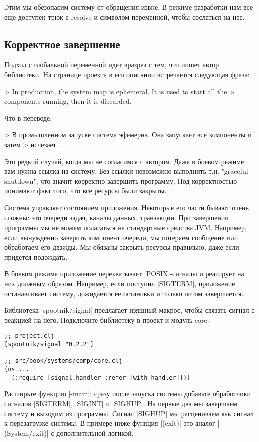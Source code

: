 Этим мы обезопасим систему от обращения извне. В режиме разработки нам все еще
доступен трюк с resolve и символом переменной, чтобы сослаться на нее.

\subsection{Корректное завершение}

Подход с глобальной переменной идет вразрез с тем, что пишет автор
библиотеки. На странице проекта в его описании встречается следующая фраза:

> In production, the system map is ephemeral. It is used to start all the
> components running, then it is discarded.

Что в переводе:

> В промышленном запуске система эфемерна. Она запускает все компоненты и затем
> исчезает.

Это редкий случай, когда мы не согласимся с автором. Даже в боевом режиме вам
нужна ссылка на систему. Без ссылки невозможно выполнить т.н. "graceful
shutdown", что значит корректно завершить программу. Под корректностью понимают
факт того, что все ресурсы были закрыты.

Система управляет состоянием приложения. Некоторые его части бывают очень
сложны: это очереди задач, каналы данных, транзакции. При завершении программы
мы не можем полагаться на стандартные средства JVM. Например, если вынужденно
заверить компонент очереди, мы потеряем сообщение или обработаем его дважды. Мы
обязаны закрыть ресурсы правильно, даже если придется подождать.

В боевом режиме приложение перехватывает \spverb|POSIX|-сигналы и реагирует на них
должным образом. Например, если поступил \spverb|SIGTERM|, приложение останавливает
систему, дожидается ее остановки и только потом завершается.

Библиотека \spverb|spootnik/signal| предлагает изящный макрос, чтобы связать сигнал с
реакцией на него. Подключите библиотеку в проект и модуль core:

\begin{verbatim}
;; project.clj
[spootnik/signal "0.2.2"]

;; src/book/systems/comp/core.clj
(ns ...
  (:require [signal.handler :refer [with-handler]]))
\end{verbatim}

Расширьте функцию \spverb|-main|: сразу после запуска системы добавьте обработчики
сигналов \spverb|SIGTERM|, \spverb|SIGINT| и \spverb|SIGHUP|. На первые два мы завершаем систему и
выходим из программы. Сигнал \spverb|SIGHUP| мы расцениваем как сигнал к перезагрузке
системы. В примере ниже функция \spverb|(exit)| это аналог \spverb|(System/exit)| с
дополнительной логикой.

